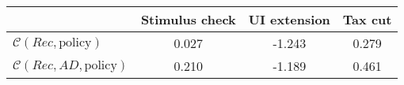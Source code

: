 \begin{tabular}{@{}lccc@{}} 
\toprule 
                          & Stimulus check      & UI extension    & Tax cut    \\  \midrule 
$\mathcal{C}(Rec,\text{policy})$ & 0.027  & -1.243  & 0.279     \\ 
$\mathcal{C}(Rec, AD,\text{policy})$ & 0.210  & -1.189  & 0.461     \\ 
\end{tabular}  

